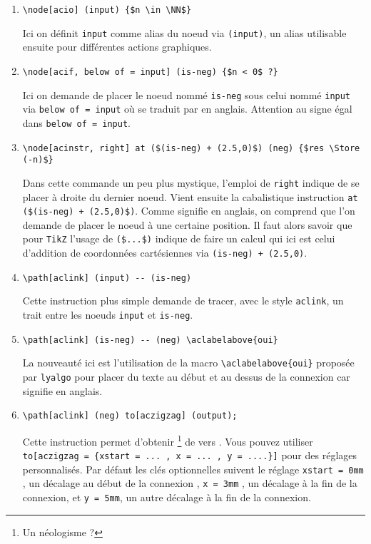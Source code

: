 \documentclass[12pt,a4paper]{article}
\newcommand\Store{\leftarrow}
\begin{document}
\begin{enumerate}
	\item \verb+\node[acio] (input) {$n \in \NN$}+
	      
	      \smallskip
	      Ici on définit \verb+input+ comme alias du noeud via \verb+(input)+, un alias utilisable ensuite pour différentes actions graphiques. 

	\medskip
	\item \verb+\node[acif, below of = input] (is-neg) {$n < 0$ ?}+

	      \smallskip
	      Ici on demande de placer le noeud nommé \verb+is-neg+ sous celui nommé \verb+input+ via \verb+below of = input+ où  se traduit par  en anglais. Attention au signe égal dans \verb+below of = input+.
	
	\medskip
	\item \verb|\node[acinstr, right] at ($(is-neg) + (2.5,0)$) (neg) {$res \Store (-n)$}|
	      
	      \smallskip
	      Dans cette commande un peu plus mystique, l'emploi de \verb+right+ indique de se placer à droite du dernier noeud.
	      Vient ensuite la cabalistique instruction \verb|at ($(is-neg) + (2.5,0)$)|.
	      Comme  signifie  en anglais, on comprend que l'on demande de placer le noeud à une certaine position.
	       Il faut alors savoir que pour \verb+TikZ+ l'usage de \verb|($...$)| indique de faire un calcul qui ici est celui d'addition de coordonnées cartésiennes via \verb|(is-neg) + (2.5,0)|. 
	
	\medskip
	\item \verb+\path[aclink] (input) -- (is-neg)+
	      
	      \smallskip
	      Cette instruction plus simple demande de tracer, avec le style \verb+aclink+, un trait entre les noeuds \verb+input+ et \verb+is-neg+.
	
	\medskip
	\item \verb+\path[aclink] (is-neg) -- (neg) \aclabelabove{oui}+
	      
	      \smallskip
	      La nouveauté ici est l'utilisation de la macro \verb+\aclabelabove{oui}+ proposée par \verb+lyalgo+ pour placer du texte au début et au dessus de la connexion car  signifie  en anglais. 

	\medskip
	\item \verb+\path[aclink] (neg) to[aczigzag] (output);+
	      
	      \smallskip
	      Cette instruction permet d'obtenir  
	      \footnote{
	          Un néologisme ?
	      }
	      de \fbox{$res \Store (-n)$} vers  .
	      Vous pouvez utiliser \verb+to[aczigzag = {xstart = ... , x = ... , y = ....}]+ pour des réglages personnalisés.
	      Par défaut les clés optionnelles suivent le réglage \verb+xstart = 0mm+ , un décalage au début de la connexion , \verb+x = 3mm+ , un décalage à la fin de la connexion, et \verb+y = 5mm+, un autre décalage à la fin de la connexion.
\end{enumerate}
\end{document}
